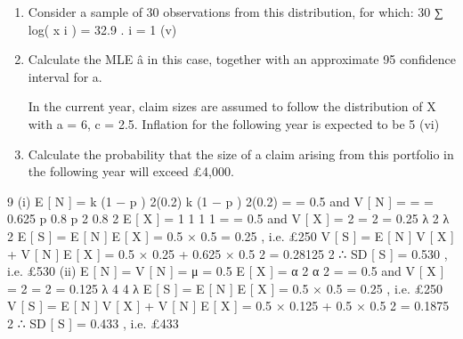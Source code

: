 \documentclass[a4paper,12pt]{article}
\begin{document}
\begin{enumerate}
\item Consider a sample of 30 observations from this distribution, for which:
30
∑ log( x i ) = 32.9 .
i = 1
(v)
\item Calculate the MLE â in this case, together with an approximate 95%
confidence interval for a.

In the current year, claim sizes are assumed to follow the distribution of X with a = 6,
c = 2.5. Inflation for the following year is expected to be 5%
(vi)
\item Calculate the probability that the size of a claim arising from this portfolio in
the following year will exceed £4,000.
\end{enumerate}


9
(i)
E [ N ] = k (1 − p ) 2(0.2)
k (1 − p ) 2(0.2)
=
= 0.5 and V [ N ] =
=
= 0.625
p
0.8
p 2
0.8 2
E [ X ] = 1 1
1
1
= = 0.5 and V [ X ] = 2 = 2 = 0.25
λ 2
λ
2
E [ S ] = E [ N ] E [ X ] = 0.5 × 0.5 = 0.25 , i.e. £250
V [ S ] = E [ N ] V [ X ] + V [ N ] { E [ X ] } = 0.5 × 0.25 + 0.625 × 0.5 2 = 0.28125
2
∴ SD [ S ] = 0.530 , i.e. £530
(ii)
E [ N ] = V [ N ] = μ = 0.5
E [ X ] =
α 2
α
2
= = 0.5 and V [ X ] = 2 = 2 = 0.125
λ 4
4
λ
E [ S ] = E [ N ] E [ X ] = 0.5 × 0.5 = 0.25 , i.e. £250
V [ S ] = E [ N ] V [ X ] + V [ N ] { E [ X ] } = 0.5 × 0.125 + 0.5 × 0.5 2 = 0.1875
2
∴ SD [ S ] = 0.433 , i.e. £433


\newpage
\end{document}
